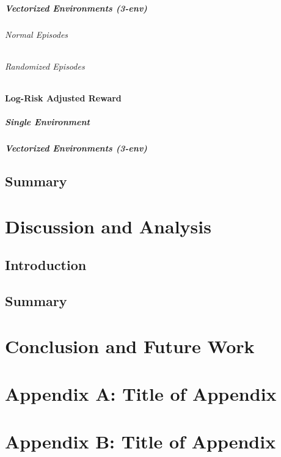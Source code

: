 \documentclass[12pt,a4paper]{report}
\begin{document}
\paragraph{Vectorized Environments (3-env)}
\subparagraph{Normal Episodes}
\subparagraph{Randomized Episodes}

\subsubsection{Log-Risk Adjusted Reward}
\paragraph{Single Environment}
\paragraph{Vectorized Environments (3-env)}


\section{Summary}


\chapter{Discussion and Analysis}

\section{Introduction}

\section{Summary}

\chapter{Conclusion and Future Work}



\appendix

\chapter{Appendix A: Title of Appendix}

\chapter{Appendix B: Title of Appendix}
\end{document}
